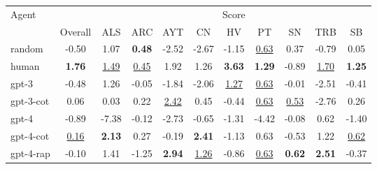 \begin{tabular}{lcccccccccc}
\toprule
Agent &  & \multicolumn{9}{c}{Score} \\
\cmidrule(lr){2-11}
 &  Overall & ALS & ARC & AYT & CN & HV & PT & SN & TRB & SB \\
\midrule
random & -0.50 & 1.07 & \textbf{0.48} & -2.52 & -2.67 & -1.15 & \underline{0.63} & 0.37 & -0.79 & 0.05 \\
human & \textbf{1.76} & \underline{1.49} & \underline{0.45} & 1.92 & 1.26 & \textbf{3.63} & \textbf{1.29} & -0.89 & \underline{1.70} & \textbf{1.25} \\
gpt-3 & -0.48 & 1.26 & -0.05 & -1.84 & -2.06 & \underline{1.27} & \underline{0.63} & -0.01 & -2.51 & -0.41 \\
gpt-3-cot & 0.06 & 0.03 & 0.22 & \underline{2.42} & 0.45 & -0.44 & \underline{0.63} & \underline{0.53} & -2.76 & 0.26 \\
gpt-4 & -0.89 & -7.38 & -0.12 & -2.73 & -0.65 & -1.31 & -4.42 & -0.08 & 0.62 & -1.40 \\
gpt-4-cot & \underline{0.16} & \textbf{2.13} & 0.27 & -0.19 & \textbf{2.41} & -1.13 & 0.63 & -0.53 & 1.22 & \underline{0.62} \\
gpt-4-rap & -0.10 & 1.41 & -1.25 & \textbf{2.94} & \underline{1.26} & -0.86 & \underline{0.63} & \textbf{0.62} & \textbf{2.51} & -0.37 \\
\bottomrule
\end{tabular}
